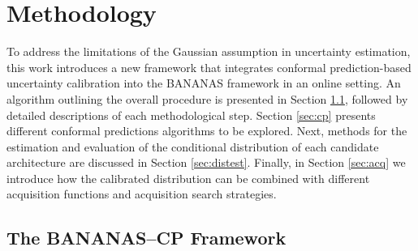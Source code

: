 \documentclass[a4paper,oneside,bibliography=totoc]{scrbook}
\begin{document}
\chapter{Methodology}
To address the limitations of the Gaussian assumption in uncertainty estimation, this work introduces a new framework that integrates conformal prediction-based uncertainty calibration into the BANANAS framework in an online setting. An algorithm outlining the overall procedure is presented in Section \ref{sec:overview}, followed by detailed descriptions of each methodological step. Section \ref{sec:cp} presents different conformal predictions algorithms to be explored. Next, methods for the estimation and evaluation of the conditional distribution of each candidate architecture are discussed in Section \ref{sec:distest}. Finally, in Section \ref{sec:acq} we introduce how the calibrated distribution can be combined with different acquisition functions and acquisition search strategies.


\section{The BANANAS--CP Framework}
\label{sec:overview}
\end{document}
